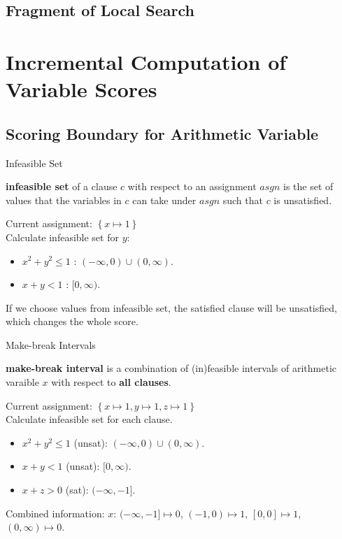 \subsection{Fragment of Local Search}

\section{Incremental Computation of Variable Scores}
\subsection{Scoring Boundary for Arithmetic Variable}

\begin{frame}{Infeasible Set}
    \begin{definition}
        \textbf{infeasible set} of a clause $c$ with respect to an assignment $\mathit{asgn}$ is the set of values that the variables in $c$ can take under $\mathit{asgn}$ such that $c$ is unsatisfied.
    \end{definition}
    \begin{example}
        Current assignment: $\left\{ x\mapsto 1\right\}$ \\
        Calculate infeasible set for $y$:
        \begin{itemize}
            \item $x^2+y^2\le 1$ : $(-\infty, 0) \cup (0, \infty)$.
            \item $x+y<1$ : $[0,\infty)$.
        \end{itemize}
    \end{example}
    If we choose values from infeasible set, the satisfied clause will be unsatisfied, which changes the whole score.
\end{frame}

\begin{frame}{Make-break Intervals}
    \begin{definition}
        \textbf{make-break interval} is a 
    combination of (in)feasible intervals of arithmetic varaible $x$ with respect to \textbf{all clauses}.
    \end{definition}

    \begin{example}
        Current assignment: $\left\{ x\mapsto 1, y\mapsto 1, z\mapsto 1 \right\}$ \\
        Calculate infeasible set for each clause.
        \begin{itemize}
            \item $x^2+y^2\le 1$ (unsat): $(-\infty, 0) \cup (0, \infty)$.
            \item $x+y<1$ (unsat): $[0,\infty)$.
            \item $x+z>0$ (sat): $(-\infty,-1]$.
        \end{itemize}
        Combined information: $x$: $(-\infty,-1]\mapsto 0$, $(-1,0)\mapsto 1$, $[0,0]\mapsto 1$, $(0,\infty)\mapsto 0$.
    \end{example}
\end{frame}

